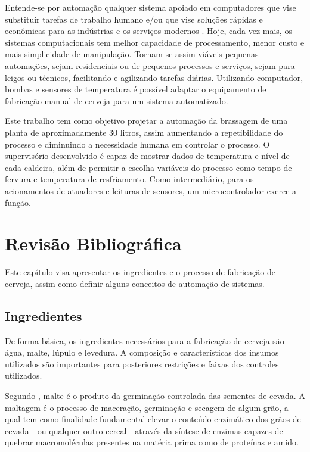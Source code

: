Entende-se por automação qualquer sistema apoiado em computadores que vise substituir tarefas de trabalho humano e/ou que vise soluções rápidas e econômicas para as indústrias e os serviços modernos \cite{Aguirre2007}. Hoje, cada vez mais, os sistemas computacionais tem melhor capacidade de processamento, menor custo e mais simplicidade de manipulação. Tornam-se assim viáveis pequenas automações, sejam residenciais ou de pequenos processos e serviços, sejam para leigos ou técnicos, facilitando e agilizando tarefas diárias. Utilizando computador, bombas e sensores de temperatura  é possível adaptar o equipamento de fabricação manual de cerveja para um sistema automatizado.

Este trabalho tem como objetivo projetar a automação da brassagem de uma planta de aproximadamente 30 litros, assim aumentando a repetibilidade do processo e diminuindo a necessidade humana em controlar o processo. O supervisório desenvolvido é capaz de mostrar dados de temperatura e nível de cada caldeira, além de permitir a escolha variáveis do processo como tempo de fervura e temperatura de resfriamento. Como intermediário, para os acionamentos de atuadores e leituras de sensores, um microcontrolador exerce a função. 

	\chapter{Revisão Bibliográfica}

Este capítulo visa apresentar os ingredientes e o processo de fabricação de cerveja, assim como definir alguns conceitos de automação de sistemas.
		\section{Ingredientes}
De forma básica, os ingredientes necessários para a fabricação de cerveja são água, malte, lúpulo e levedura. A composição e características dos insumos utilizados são importantes para posteriores restrições e faixas dos controles utilizados.

Segundo , malte é o produto da germinação controlada das sementes de cevada. A maltagem é o processo de maceração, germinação e secagem de algum grão, a qual tem como finalidade fundamental elevar o conteúdo enzimático dos grãos de cevada - ou qualquer outro cereal - através da síntese de enzimas capazes de quebrar macromoléculas presentes na matéria prima como de proteínas e amido.

